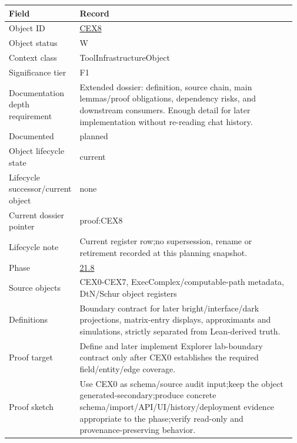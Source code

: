 \begin{longtable}{L{0.16\linewidth} L{0.81\linewidth}}
\hline
\textbf{Field} & \textbf{Record}\\
\hline
Object ID & \hyperlink{object-row-CEX8}{CEX8}\\
\hline\addlinespace[0.20em]
Object status & W\\
\hline\addlinespace[0.20em]
Context class & ToolInfrastructureObject\\
\hline\addlinespace[0.20em]
Significance tier & F1\\
\hline\addlinespace[0.20em]
Documentation depth requirement & Extended dossier: definition, source chain, main lemmas/\allowbreak{}proof obligations, dependency risks, and downstream consumers. Enough detail for later implementation without re-reading chat history.\\
\hline\addlinespace[0.20em]
Documented & planned\\
\hline\addlinespace[0.20em]
Object lifecycle state & current\\
\hline\addlinespace[0.20em]
Lifecycle successor/\allowbreak{}current object & none\\
\hline\addlinespace[0.20em]
Current dossier pointer & proof:CEX8\\
\hline\addlinespace[0.20em]
Lifecycle note & Current register row;\newline no supersession, rename or retirement recorded at this planning snapshot.\\
\hline\addlinespace[0.20em]
Phase & \hyperlink{phase-row-21-8}{21.8}\\
\hline\addlinespace[0.20em]
Source objects & CEX0-CEX7, ExecComplex/\allowbreak{}computable-path metadata, DtN/\allowbreak{}Schur object registers\\
\hline\addlinespace[0.20em]
Definitions & Boundary contract for later bright/\allowbreak{}interface/\allowbreak{}dark projections, matrix-entry displays, approximants and simulations, strictly separated from Lean-derived truth.\\
\hline\addlinespace[0.20em]
Proof target & Define and later implement Explorer lab-boundary contract only after CEX0 establishes the required field/\allowbreak{}entity/\allowbreak{}edge coverage.\\
\hline\addlinespace[0.20em]
Proof sketch & Use CEX0 as schema/\allowbreak{}source audit input;\newline keep the object generated-secondary;\newline produce concrete schema/\allowbreak{}import/\allowbreak{}API/\allowbreak{}UI/\allowbreak{}history/\allowbreak{}deployment evidence appropriate to the phase;\newline verify read-only and provenance-preserving behavior.\\

\end{longtable}
